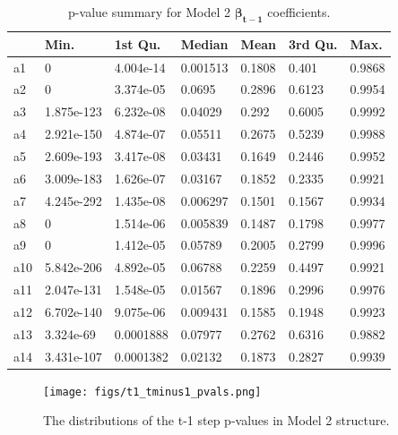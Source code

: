 \documentclass[11pt]{article}
\begin{document}
\begin{table}[H]
\centering
\caption{p-value summary for Model 2 $\bm{\beta_{t-1}}$ coefficients.}
\begin{tabular}{@{}lllllll@{}}
\toprule
    & Min.       & 1st Qu.   & Median   & Mean   & 3rd Qu. & Max.   \\ \midrule
a1  & 0          & 4.004e-14 & 0.001513 & 0.1808 & 0.401   & 0.9868 \\
a2  & 0          & 3.374e-05 & 0.0695   & 0.2896 & 0.6123  & 0.9954 \\
a3  & 1.875e-123 & 6.232e-08 & 0.04029  & 0.292  & 0.6005  & 0.9992 \\
a4  & 2.921e-150 & 4.874e-07 & 0.05511  & 0.2675 & 0.5239  & 0.9988 \\
a5  & 2.609e-193 & 3.417e-08 & 0.03431  & 0.1649 & 0.2446  & 0.9952 \\
a6  & 3.009e-183 & 1.626e-07 & 0.03167  & 0.1852 & 0.2335  & 0.9921 \\
a7  & 4.245e-292 & 1.435e-08 & 0.006297 & 0.1501 & 0.1567  & 0.9934 \\
a8  & 0          & 1.514e-06 & 0.005839 & 0.1487 & 0.1798  & 0.9977 \\
a9  & 0          & 1.412e-05 & 0.05789  & 0.2005 & 0.2799  & 0.9996 \\
a10 & 5.842e-206 & 4.892e-05 & 0.06788  & 0.2259 & 0.4497  & 0.9921 \\
a11 & 2.047e-131 & 1.548e-05 & 0.01567  & 0.1896 & 0.2996  & 0.9976 \\
a12 & 6.702e-140 & 9.075e-06 & 0.009431 & 0.1585 & 0.1948  & 0.9923 \\
a13 & 3.324e-69  & 0.0001888 & 0.07977  & 0.2762 & 0.6316  & 0.9882 \\
a14 & 3.431e-107 & 0.0001382 & 0.02132  & 0.1873 & 0.2827  & 0.9939 \\ \bottomrule
\end{tabular}
\label{m2_t-1}
\end{table}
\begin{figure}[H]
\vspace{6em}
\centering
\texttt{[image: figs/t1\_tminus1\_pvals.png]}
\caption{The distributions of the t-1 step p-values in Model 2 structure.}
\label{fig:p_dist}
\end{figure}
\newpage
\end{document}
